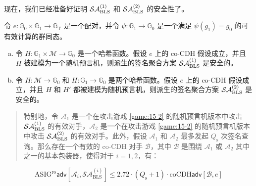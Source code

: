 现在，我们已经准备好证明 $\mathcal{SA}_{\rm BLS}^{(1)}$ 和 $\mathcal{SA}_{\rm BLS}^{(2)}$ 的安全性了。

\begin{theorem}\label{theo:15-2}
令 $e:\mathbb{G}_0\times\mathbb{G}_1\to\mathbb{G}_\mathrm{T}$ 是一个配对，并令 $\psi:\mathbb{G}_1\to\mathbb{G}_0$ 是一个满足 $\psi(g_1)=g_0$ 的可有效计算的群同态。
\begin{enumerate}[(a)]
	\item 令 $H:\mathbb{G}_1\times\mathcal{M}\to\mathbb{G}_0$ 是一个哈希函数。假设 $e$ 上的 co-CDH 假设成立，并且 $H$ 被建模为一个随机预言机，则派生的签名聚合方案 $\mathcal{SA}_{\rm BLS}^{(1)}$ 是安全的。
	\item 令 $H:\mathcal{M}\to\mathbb{G}_0$ 和 $H:\mathbb{G}_1\to\mathbb{G}_0$ 是两个哈希函数。假设 $e$ 上的 co-CDH 假设成立，并且 $H$ 和 $H'$ 都被建模为随机预言机，则派生的签名聚合方案 $\mathcal{SA}_{\rm BLS}^{(2)}$ 是安全的。
\end{enumerate}
\begin{quote}
特别地，令 $\mathcal{A}_1$ 是一个在攻击游戏 \ref{game:15-2} 的随机预言机版本中攻击 $\mathcal{SA}_{\rm BLS}^{(1)}$ 的有效对手，$\mathcal{A}_2$ 是一个在攻击游戏 \ref{game:15-2} 的随机预言机版本中攻击 $\mathcal{SA}_{\rm BLS}^{(2)}$ 的有效对手。此外，假设 $\mathcal{A}_1$ 和 $\mathcal{A}_2$ 最多发起 $Q_\mathrm{s}$ 次签名查询。那么存在一个有效的 co-CDH 对手 $\mathcal{B}$，其中 $\mathcal{B}$ 是围绕 $\mathcal{A}_1$ 或 $\mathcal{A}_2$ 其中之一的基本包装器，使得对于 $i=1,2$，有：
\end{quote}
\begin{equation}\label{eq:15-10}
\mathrm{ASIG}^\mathrm{ro}\mathsf{adv}[\mathcal{A}_i,\mathcal{SA}_\mathrm{BLS}^{(i)}]
\leq 2.72\cdot (Q_\mathrm{s}+1)\cdot
\mathrm{coCDH}\mathsf{adv}[\mathcal{B},e]
\end{equation}
\end{theorem}

